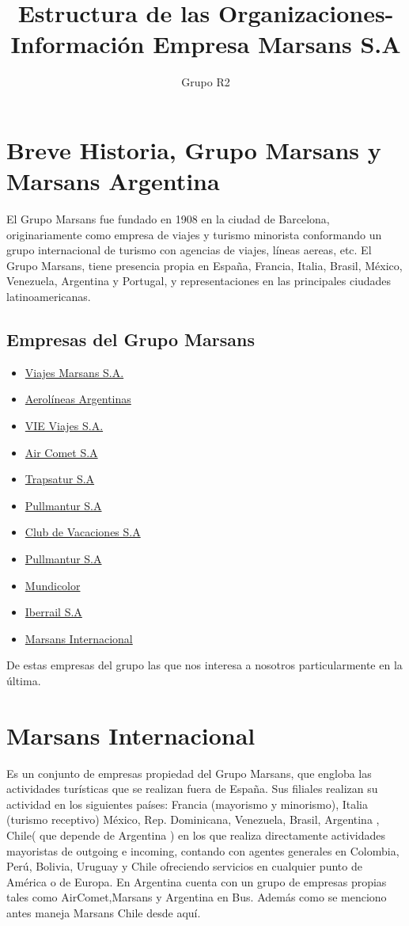 \documentclass[12pt,a4paper,spanish]{article}
\begin{document}
 

\pagestyle{plain}
\title{Estructura de las Organizaciones-Informaci\'{o}n Empresa Marsans S.A} 
\author{Grupo R2} 
\maketitle 
\newpage
\tableofcontents
\newpage
\section{Breve Historia, Grupo Marsans y Marsans Argentina}
\begin{flushleft}
El Grupo Marsans fue fundado en 1908 en la ciudad de Barcelona, originariamente como empresa de viajes y turismo minorista conformando un grupo internacional de turismo con agencias de viajes, l\'ineas aereas, etc. El Grupo Marsans, tiene presencia propia en Espa\~na, Francia, Italia, Brasil, M\'{e}xico, Venezuela, Argentina y Portugal, y representaciones en las principales ciudades latinoamericanas.
\subsection{Empresas del Grupo Marsans}
\begin{itemize}
	\item \underline{Viajes Marsans S.A.}
	\item \underline{Aerol\'{i}neas Argentinas}
	\item \underline{VIE Viajes S.A.}
	\item \underline{Air Comet S.A }
	\item \underline{Trapsatur S.A}
	\item \underline{Pullmantur S.A}
	\item \underline{Club de Vacaciones S.A}
	\item \underline{Pullmantur S.A}	
	\item \underline{Mundicolor}
	\item \underline{Iberrail S.A}
	\item \underline{Marsans Internacional}			
\end{itemize}
De estas empresas del grupo las que nos interesa a nosotros particularmente en la \'{u}ltima.
\newpage
\section{Marsans Internacional}
Es un conjunto de empresas propiedad del Grupo Marsans, que engloba las actividades tur\'{i}sticas que se realizan fuera de Espa\~{n}a.
Sus filiales realizan su actividad en los siguientes pa\'{i}ses: Francia (mayorismo y minorismo), Italia (turismo receptivo) M\'{e}xico, Rep. Dominicana, Venezuela, Brasil, Argentina , Chile( que depende de Argentina )  en los que realiza directamente actividades mayoristas de outgoing e incoming, contando con agentes generales en Colombia, Per\'{u}, Bolivia, Uruguay y Chile   ofreciendo servicios en cualquier punto de Am\'{e}rica o de Europa.
En Argentina cuenta con un grupo de empresas propias tales como AirComet,Marsans y Argentina en Bus. Adem\'{a}s como se menciono antes maneja Marsans Chile desde aqu\'{i}.


\end{flushleft}
\end{document}
